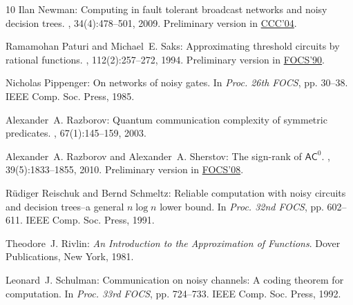 \begin{thebibliography}{10}
{\sc Ilan Newman}: Computing in fault tolerant broadcast networks and noisy
  decision trees.
, 34(4):478--501, 2009.
\newblock Preliminary version in
  \href{http://dx.doi.org/10.1109/CCC.2004.1313813}{CCC'04}.

{\sc Ramamohan Paturi and Michael~E. Saks}: Approximating threshold circuits by
  rational functions.
, 112(2):257--272, 1994.
\newblock Preliminary version in
  \href{http://dx.doi.org/10.1109/FSCS.1990.89559}{FOCS'90}.

{\sc Nicholas Pippenger}: On networks of noisy gates.
\newblock In {\em Proc. 26th FOCS}, pp. 30--38. IEEE Comp. Soc. Press, 1985.

{\sc Alexander~A. Razborov}: Quantum communication complexity of symmetric
  predicates.
, 67(1):145--159, 2003.

{\sc Alexander~A. Razborov and Alexander~A. Sherstov}: The sign-rank of
  {$\mathsf{AC}^0$}.
, 39(5):1833--1855, 2010.
\newblock Preliminary version in
  \href{http://dx.doi.org/10.1109/FOCS.2008.19}{FOCS'08}.
\newblock [\epfmtdoi{10.1137/080744037}]

{\sc R{\"u}diger Reischuk and Bernd Schmeltz}: Reliable computation with noisy
  circuits and decision trees--a general $n\log n$ lower bound.
\newblock In {\em Proc. 32nd FOCS}, pp. 602--611. IEEE Comp. Soc. Press, 1991.

{\sc Theodore~J. Rivlin}: {\em An Introduction to the Approximation of
  Functions}.
\newblock Dover Publications, New York, 1981.

{\sc Leonard~J. Schulman}: Communication on noisy channels: A coding theorem
  for computation.
\newblock In {\em Proc. 33rd FOCS}, pp. 724--733. IEEE Comp. Soc. Press, 1992.


\end{thebibliography}
